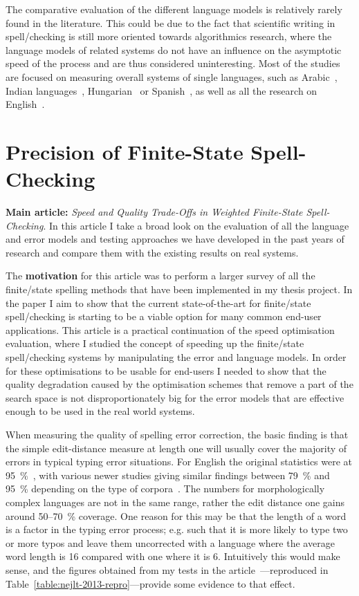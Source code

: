 \documentclass[officiallayout]{unihelcompling}
\begin{document}
The comparative evaluation of the different language models is relatively
rarely found in the literature. This could be due to the fact that scientific
writing in spell\-/checking is still more oriented towards algorithmics
research, where the language models of related systems do not have an influence
on the asymptotic speed of the process and are thus considered uninteresting.
Most of the studies are focused on measuring overall systems of single
languages, such as Arabic~\citep{attia2013improved}, Indian
languages~\citep{chaudhuri2002towards}, Hungarian~\citep{tron2005hunmorph} or
Spanish~\cite{otero2007contextual}, as well as all the research on
English~\citep{mitton1987spelling}.

\section{Precision of Finite-State Spell-Checking}
\label{sec:quality}

\textbf{Main article:} \emph{Speed and Quality Trade-Offs in Weighted
Finite-State Spell-Checking}. In this article I take a broad look on the
evaluation of all the language and error models and testing approaches we have
developed in the past years of research and compare them with the existing
results on real systems.

The \textbf{motivation} for this article was to perform a larger survey of all
the finite\-/state spelling methods that have been implemented in my thesis
project. In the paper I aim to show that the current state-of-the-art for
finite\-/state spell\-/checking is starting to be a viable option for many
common end-user applications. This article is a practical continuation of the
speed optimisation evaluation, where I studied the concept of speeding up the
finite\-/state spell\-/checking systems by manipulating the error and language
models. In order for these optimisations to be usable for end-users I needed to
show that the quality degradation caused by the optimisation schemes that
remove a part of the search space is not disproportionately big for the error
models that are effective enough to be used in the real world systems.

When measuring the quality of spelling error correction, the basic finding is
that the simple edit-distance measure at length one will usually cover the
majority of errors in typical typing error situations. For English the original
statistics were at 95~\%~\citep{damerau1964technique}, with various newer
studies giving similar findings between 79~\% and 95~\% depending on the type
of corpora~\citep{kukich1992spelling}.  The numbers for morphologically complex
languages are not in the same range, rather the edit distance one gains around
50--70~\% coverage. One reason for this may be that the length of a word is a
factor in the typing error process; e.g. such that it is more likely to type
two or more typos and leave them uncorrected with a language where the average
word length is 16 compared with one where it is 6. Intuitively this would make
sense, and the figures obtained from my tests in the article~---reproduced in Table~\ref{table:nejlt-2013-repro}---provide some
evidence to that effect.
\end{document}
